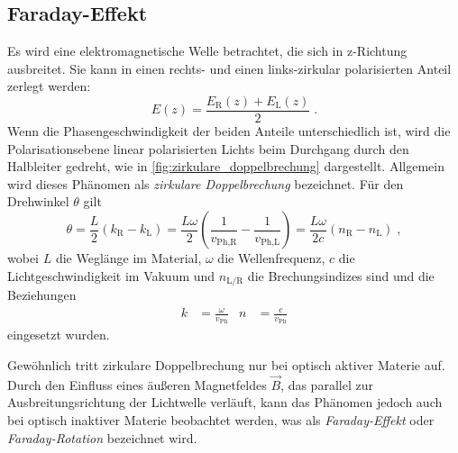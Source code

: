 \subsection{Faraday-Effekt}
%
Es wird eine elektromagnetische Welle betrachtet, die sich in z-Richtung ausbreitet.
Sie kann in einen rechts- und einen links-zirkular polarisierten Anteil zerlegt werden:
\begin{equation*}
    E(z) = \frac{E_\text{R}(z) + E_\text{L}(z)}{2} \; .
\end{equation*}
Wenn die Phasengeschwindigkeit der beiden Anteile unterschiedlich ist,
wird die Polarisationsebene linear polarisierten Lichts beim Durchgang durch den Halbleiter gedreht,
    wie in \autoref{fig:zirkulare_doppelbrechung} dargestellt.
Allgemein wird dieses Phänomen als \emph{zirkulare Doppelbrechung} bezeichnet.
Für den Drehwinkel $\theta$ gilt
\begin{equation*}
    \theta
    = \frac{L}{2}(k_\text{R} - k_\text{L})
    = \frac{L \omega}{2} \left(
        \frac{1}{v_\text{Ph,R}} -
        \frac{1}{v_\text{Ph,L}}
    \right)
    = \frac{L \omega}{2 c} (n_\text{R} - n_\text{L}) \; ,
\end{equation*}
wobei
    $L$ die Weglänge im Material,
    $\omega$ die Wellenfrequenz,
    $c$ die Lichtgeschwindigkeit im Vakuum
    und $n_\text{L/R}$ die Brechungsindizes
sind
und die Beziehungen
\begin{align*}
    k &= \frac{\omega}{v_\text{Ph}}
    &
    n &= \frac{c}{v_\text{Ph}}
\end{align*}
eingesetzt wurden.

Gewöhnlich tritt zirkulare Doppelbrechung nur bei optisch aktiver Materie auf.
Durch den Einfluss eines äußeren Magnetfeldes $\vec B$,
    das parallel zur Ausbreitungsrichtung der Lichtwelle verläuft,
kann das Phänomen jedoch auch bei optisch inaktiver Materie beobachtet werden,
was als \emph{Faraday-Effekt} oder \emph{Faraday-Rotation} bezeichnet wird.

